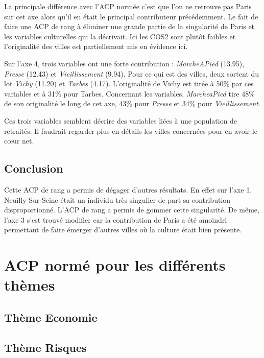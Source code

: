 \documentclass{article}
\begin{document}
La principale différence avec l'ACP normée c'est que l'on ne retrouve pas Paris sur cet axe alors qu'il en était le principal contributeur précédemment. Le fait de faire une ACP de rang à éliminer une grande partie de la singularité de Paris et les variables culturelles qui la décrivait. Ici les COS2 sont plutôt faibles et l'originalité des villes est partiellement mis en évidence ici.

\bigskip

Sur l'axe 4, trois variables ont une forte contribution : \emph{MarcheAPied} (13.95), \emph{Presse} (12.43) et \emph{Vieillissement} (9.94). Pour ce qui est des villes, deux sortent du lot \emph{Vichy} (11.20) et \emph{Tarbes} (4.17). L'originalité de Vichy est tirée à 50\% par ces variables et à 31\% pour Tarbes. Concernant les variables, \emph{MarcheaPied} tire 48\% de son originalité le long de cet axe, 43\% pour \emph{Presse} et 34\% pour \emph{Vieillissement}. 

\bigskip

Ces trois variables semblent décrire des variables liées à une population de retraités. Il faudrait regarder plus en détails les villes concernées pour en avoir le c\oe ur net. 

\subsection{Conclusion}

Cette ACP de rang a permis de dégager d'autres résultats. En effet sur l'axe 1, Neuilly-Sur-Seine était un individu très singulier de part sa contribution disproportionné. L'ACP de rang a permis de gommer cette singularité. De même, l'axe 3 s'est trouvé modifier car la contribution de Paris a été amoindri permettant de faire émerger d'autres villes où la culture était bien présente. 


\section{ACP normé pour les différents thèmes}

\subsection{Thème Economie} 

\subsection{Thème Risques}
\end{document}
